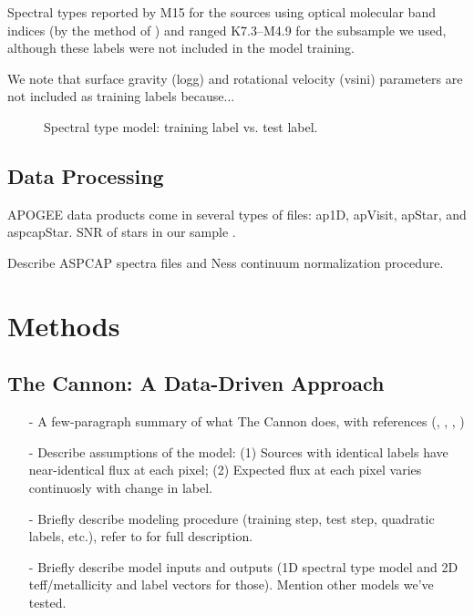 \documentclass[modern]{aastex62}
\begin{document}
Spectral types reported by M15 for the sources using optical molecular band indices (by the method of \citealt{Lepine:2013}) and ranged K7.3--M4.9 for the subsample we used, although these labels were not included in the model training.

We note that surface gravity (logg) and rotational velocity (vsini) parameters are not included as training labels because...

\begin{figure}[ht]
\caption{Spectral type model: training label vs. test label.} \label{fig:west_selftest} \label{fig:train_dist}
\end{figure}

\subsection{Data Processing}

APOGEE data products come in several types of files: ap1D, apVisit, apStar, and aspcapStar. SNR of stars in our sample \citealt{Perez:2016}.

Describe ASPCAP spectra files and Ness continuum normalization procedure.


\section{Methods} \label{sec:cannon}

\subsection{The Cannon: A Data-Driven Approach}

\begin{enumerate}
\item[-] A few-paragraph summary of what The Cannon does, with references (\citealt{Ness:2015}, \citealt{Casey:2016}, \citealt{Ho:2017a}, \citealt{Ho:2017b})
\item[-] Describe assumptions of the model: (1) Sources with identical labels have near-identical flux at each pixel; (2) Expected flux at each pixel varies continuosly with change in label. 
\item[-] Briefly describe modeling procedure (training step, test step, quadratic labels, etc.), refer to \citealt{Ness:2015} for full description.
\item[-] Briefly describe model inputs and outputs (1D spectral type model and 2D teff/metallicity and label vectors for those). Mention other models we've tested.
\end{enumerate}
\end{document}
